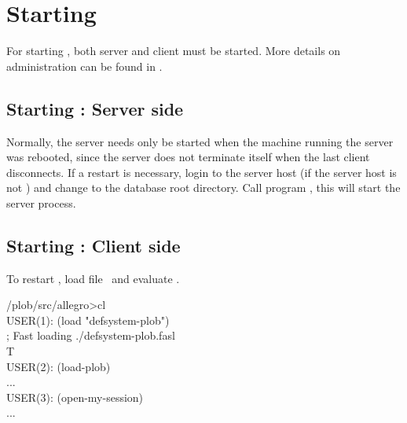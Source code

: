 \section[Starting PLOB]%
{Starting \protect\plob}

For starting \plob, both server and client must be started. More
details on administration can be found in \cite{bib:PLOB-UsersGuide}.

\subsection[Server side]%
{Starting \protect\plob: Server side}

Normally, the server needs only be started when the machine running
the server was rebooted, since the server does not terminate itself
when the last client disconnects.  If a restart is necessary, login to
the server host (if the server host is not ) and
change to the database root directory. Call program , this will start the server process.

\subsection[Client side]%
{Starting \protect\plob: Client side}

\noindent To restart \plob, load file \ and evaluate
.\\[\smallskipamount]
\begin{tt}\CodeSize
\td/plob/src/allegro>cl\\
USER(1): (load "defsystem-plob")\\
; Fast loading ./defsystem-plob.fasl\\
T\\
USER(2): (load-plob)\\
...\\
USER(3): (open-my-session)\\
...\\
\end{tt}






